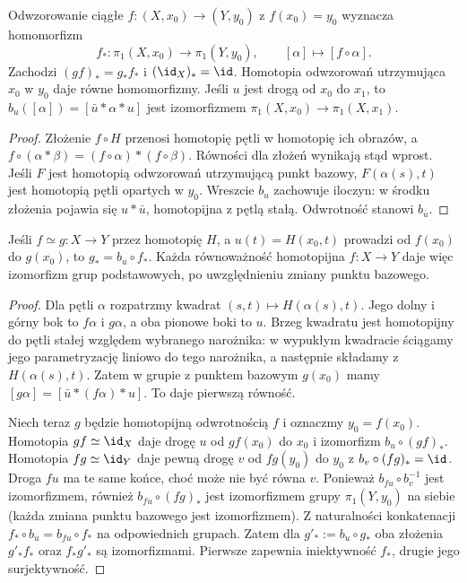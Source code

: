 \begin{stwierdzenie}
\label{prop:pi1-funktor}
Odwzorowanie ciągłe $f:(X,x_0)\to(Y,y_0)$
z $f(x_0)=y_0$ wyznacza homomorfizm
\[
 f_*:\pi_1(X,x_0)\to\pi_1(Y,y_0),
 \qquad [\alpha]\mapsto[f\circ\alpha].
\]
Zachodzi $(gf)_*=g_*f_*$ i
$(\id_X)_*=\id$. Homotopia odwzorowań
utrzymująca $x_0$ w $y_0$ daje
równe homomorfizmy. Jeśli
$u$ jest drogą od $x_0$ do $x_1$,
to $b_u([\alpha])=[\bar u*\alpha*u]$
jest izomorfizmem
$\pi_1(X,x_0)\to\pi_1(X,x_1)$.
\end{stwierdzenie}
\begin{proof}
Złożenie $f\circ H$ przenosi homotopię
pętli w homotopię ich obrazów, a
$f\circ(\alpha*\beta)
=(f\circ\alpha)*(f\circ\beta)$.
Równości dla złożeń wynikają stąd wprost.
Jeśli $F$ jest homotopią odwzorowań utrzymującą
punkt bazowy, $F(\alpha(s),t)$ jest
homotopią pętli opartych w $y_0$.
Wreszcie $b_u$ zachowuje iloczyn:
w środku złożenia pojawia się
$u*\bar u$, homotopijna z pętlą stałą.
Odwrotność stanowi $b_{\bar u}$.
\end{proof}

\begin{wniosek}
\label{cor:pi1-homotopia}
Jeśli $f\simeq g:X\to Y$ przez homotopię
$H$, a $u(t)=H(x_0,t)$ prowadzi od
$f(x_0)$ do $g(x_0)$, to
$g_*=b_u\circ f_*$. Każda równoważność
homotopijna $f:X\to Y$ daje więc
izomorfizm grup podstawowych,
po uwzględnieniu zmiany punktu bazowego.
\end{wniosek}
\begin{proof}
Dla pętli $\alpha$ rozpatrzmy kwadrat
$(s,t)\mapsto H(\alpha(s),t)$.
Jego dolny i górny bok to $f\alpha$
i $g\alpha$, a oba pionowe boki to
$u$. Brzeg kwadratu jest homotopijny do pętli stałej względem
wybranego narożnika: w wypukłym kwadracie ściągamy jego parametryzację
liniowo do tego narożnika, a następnie składamy z $H(\alpha(s),t)$.
Zatem w grupie z punktem
bazowym $g(x_0)$ mamy
$[g\alpha]=[\bar u*(f\alpha)*u]$.
To daje pierwszą równość.

Niech teraz $g$ będzie homotopijną
odwrotnością $f$ i oznaczmy
$y_0=f(x_0)$. Homotopia
$gf\simeq\id_X$ daje drogę $u$
od $gf(x_0)$ do $x_0$ i
izomorfizm $b_u\circ(gf)_*$.
Homotopia $fg\simeq\id_Y$ daje pewną drogę $v$
od $fg(y_0)$ do $y_0$ z $b_v\circ(fg)_*=\id$.
Droga $fu$ ma te same końce, choć może nie być równa $v$.
Ponieważ $b_{fu}\circ b_v^{-1}$ jest izomorfizmem,
również $b_{fu}\circ(fg)_*$ jest izomorfizmem grupy
$\pi_1(Y,y_0)$ na siebie
(każda zmiana punktu bazowego
jest izomorfizmem).
Z naturalności konkatenacji
$f_*\circ b_u=b_{f u}\circ f_*$
na odpowiednich grupach.
Zatem dla $g'_*:=b_u\circ g_*$
oba złożenia $g'_*f_*$
oraz $f_*g'_*$ są izomorfizmami.
Pierwsze zapewnia iniektywność
$f_*$, drugie jego surjektywność.
\end{proof}

